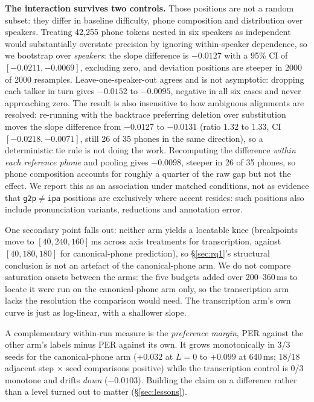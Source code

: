 \documentclass[journal]{IEEEtran}
\begin{document}
\textbf{The interaction survives two controls.} Those positions are not a
random subset: they differ in baseline difficulty, phone composition and
distribution over speakers. Treating 42{,}255 phone tokens nested in six
speakers as independent would substantially overstate precision by ignoring
within-speaker dependence, so we bootstrap over
\emph{speakers}: the slope difference is $-0.0127$ with a 95\% CI of
$[-0.0211, -0.0069]$, excluding zero, and deviation positions are steeper in
2000 of 2000 resamples. Leave-one-speaker-out agrees and is not asymptotic:
dropping each talker in turn gives $-0.0152$ to $-0.0095$, negative in all six
cases and never approaching zero. The result is also insensitive to how
ambiguous alignments are resolved: re-running with the backtrace preferring
deletion over substitution moves the slope difference from $-0.0127$ to
$-0.0131$ (ratio $1.32$ to $1.33$, CI $[-0.0218, -0.0071]$, still 26 of 35
phones in the same direction), so a deterministic tie rule is not doing the
work. Recomputing the difference \emph{within each reference
phone} and pooling gives $-0.0098$, steeper in 26 of 35 phones, so phone
composition accounts for roughly a quarter of the raw gap but not the effect.
We report this as an association under matched conditions, not as evidence
that \texttt{g2p}$\neq$\texttt{ipa} positions are exclusively where accent
resides: such positions also include pronunciation variants, reductions and
annotation error.

One secondary point falls out: neither arm yields a locatable knee
(breakpoints move to $[40, 240, 160]$\,ms across axis treatments for
transcription, against $[40, 180, 180]$ for canonical-phone prediction), so
\S\ref{sec:rq1}'s structural conclusion is not an artefact of the
canonical-phone arm. We do not compare saturation onsets between the arms: the five budgets
added over 200--360\,ms to locate it were run on the canonical-phone arm only, so
the transcription arm lacks the resolution the comparison would need. The
transcription arm's own curve is just as log-linear, with a shallower slope.

A complementary within-run measure is the \emph{preference margin}, PER
against the other arm's labels minus PER against its own. It grows
monotonically in 3/3 seeds for the canonical-phone arm ($+0.032$ at $L{=}0$ to $+0.099$ at 640\,ms; 18/18
adjacent step $\times$ seed comparisons positive) while the transcription
control is 0/3 monotone and drifts \emph{down} ($-0.0103$). Building the claim
on a difference rather than a level turned out to matter
(\S\ref{sec:lessons}).
\end{document}
